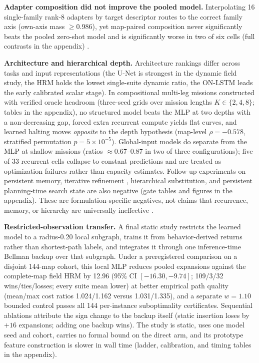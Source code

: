 \documentclass[letterpaper]{article} %
\begin{document}
\textbf{Adapter composition did not improve the pooled model.} Interpolating 16 single-family rank-8 adapters by target descriptor routes to the correct family axis (own-axis mass $\geq$0.986), yet map-paired composition never significantly beats the pooled zero-shot model and is significantly worse in two of six cells (full contrasts in the appendix) \citep{wortsman2022soups,ilharco2022task}.

\textbf{Architecture and hierarchical depth.} Architecture rankings differ across tasks and input representations (the U-Net is strongest in the dynamic field study, the HRM holds the lowest single-suite dynamic ratio, the ON-LSTM leads the early calibrated scalar stage). In compositional multi-leg missions constructed with verified oracle headroom (three-seed grids over mission lengths $K \in \{2,4,8\}$; tables in the appendix), no structured model beats the MLP at two depths with a non-decreasing gap, forced extra recurrent compute yields flat curves, and learned halting moves \emph{opposite} to the depth hypothesis (map-level $\rho=-0.578$, stratified permutation $p=5\times10^{-5}$). Global-input models do separate from the MLP at shallow missions (ratios ${\approx}$0.67--0.87 in two of three configurations); five of 33 recurrent cells collapse to constant predictions and are treated as optimization failures rather than capacity estimates. Follow-up experiments on persistent memory, iterative refinement \citep{tamar2016vin,lee2018gppn}, hierarchical substitution, and persistent planning-time search state are also negative (gate tables and figures in the appendix). These are formulation-specific negatives, not claims that recurrence, memory, or hierarchy are universally ineffective \citep{jolicoeur2025trm,czechowski2021subgoal}.

\textbf{Restricted-observation transfer.} A final static study restricts the learned model to a radius-0.20 local subgraph, trains it from behavior-derived returns rather than shortest-path labels, and integrates it through one inference-time Bellman backup over that subgraph. Under a preregistered comparison on a disjoint 144-map cohort, this local MLP reduces pooled expansions against the complete-map field HRM by 12.96 (95\% CI $[-16.30,-9.74]$; 109/3/32 wins/ties/losses; every suite mean lower) at better empirical path quality (mean/max cost ratios 1.024/1.162 versus 1.031/1.335), and a separate $w{=}1.10$ bounded control passes all 144 per-instance suboptimality certificates. Sequential ablations attribute the sign change to the backup itself (static insertion loses by $+16$ expansions; adding one backup wins). The study is static, uses one model seed and cohort, carries no formal bound on the direct arm, and its prototype feature construction is slower in wall time (ladder, calibration, and timing tables in the appendix).
\end{document}
